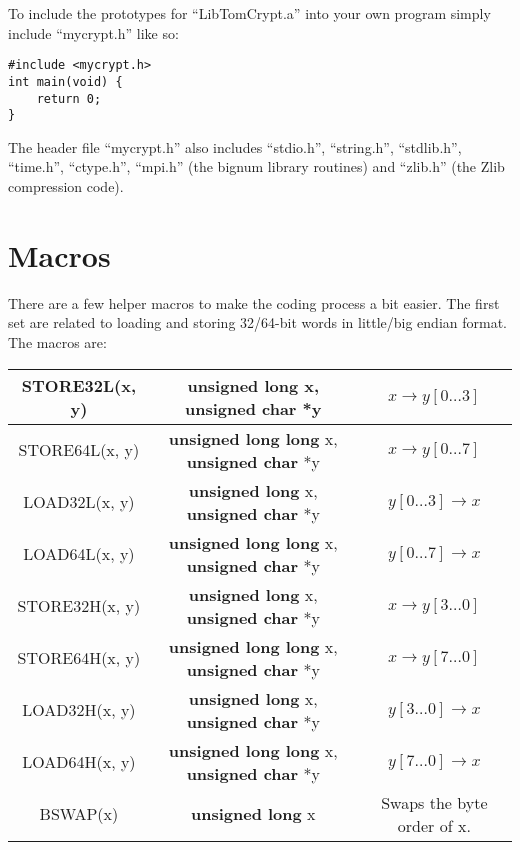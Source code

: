 \documentclass{book}
\begin{document}
To include the prototypes for ``LibTomCrypt.a'' into your own program simply include ``mycrypt.h'' like so:
\begin{verbatim}
#include <mycrypt.h>
int main(void) {
    return 0;
}
\end{verbatim}

The header file ``mycrypt.h'' also includes ``stdio.h'', ``string.h'', ``stdlib.h'', ``time.h'', ``ctype.h'', ``mpi.h''
(the bignum library routines) and ``zlib.h'' (the Zlib compression code).

\section{Macros}

There are a few helper macros to make the coding process a bit easier.  The first set are related to loading and storing
32/64-bit words in little/big endian format.  The macros are:

   
    
\begin{small}
\begin{center}
\begin{tabular}{|c|c|c|}
     \hline STORE32L(x, y) & {\bf unsigned long} x, {\bf unsigned char} *y & $x \to y[0 \ldots 3]$ \\
     \hline STORE64L(x, y) & {\bf unsigned long long} x, {\bf unsigned char} *y & $x \to y[0 \ldots 7]$ \\
     \hline LOAD32L(x, y) & {\bf unsigned long} x, {\bf unsigned char} *y & $y[0 \ldots 3] \to x$ \\
     \hline LOAD64L(x, y) & {\bf unsigned long long} x, {\bf unsigned char} *y & $y[0 \ldots 7] \to x$ \\
     \hline STORE32H(x, y) & {\bf unsigned long} x, {\bf unsigned char} *y & $x \to y[3 \ldots 0]$ \\
     \hline STORE64H(x, y) & {\bf unsigned long long} x, {\bf unsigned char} *y & $x \to y[7 \ldots 0]$ \\
     \hline LOAD32H(x, y) & {\bf unsigned long} x, {\bf unsigned char} *y & $y[3 \ldots 0] \to x$ \\
     \hline LOAD64H(x, y) & {\bf unsigned long long} x, {\bf unsigned char} *y & $y[7 \ldots 0] \to x$ \\
     \hline BSWAP(x) & {\bf unsigned long} x & Swaps the byte order of x. \\
     \hline
\end{tabular}
\end{center}
\end{small}
\end{document}
